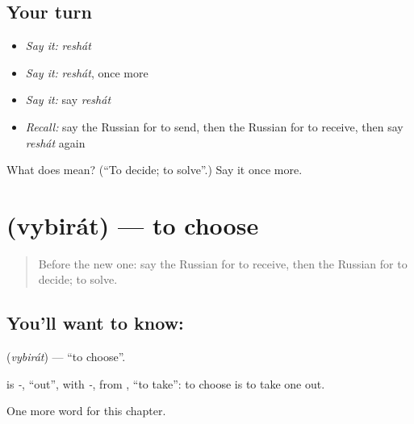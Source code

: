 \subsection*{Your turn}
\begin{itemize}
\raggedright
  \item \emph{Say it:} \emph{reshát}
  \item \emph{Say it:} \emph{reshát}, once more
  \item \emph{Say it:} say \emph{reshát}
  \item \emph{Recall:} say the Russian for to send, then the Russian for to receive, then say \emph{reshát} again
\end{itemize}

\begin{tcolorbox}[breakable,colback=teal!4,colframe=teal!35!black,title={Before you move on}]
What does  mean? (\textquotedblleft{}To decide; to solve\textquotedblright{}.) Say it once more.
\end{tcolorbox}
\section[\texorpdfstring{\ru{выбирать} (vybirát)}{выбирать (vybirát)}]{ (vybirát) — to choose}

\label{lesson:RU-C233-vybirat}



\begin{quote}
Before the new one: say the Russian for to receive, then the Russian for to decide; to solve.
\end{quote}

\subsection*{You'll want to know: }
\textbf{} (\emph{vybirát}) — \textquotedblleft{}to choose\textquotedblright{}.

\begin{cousinweb}
\textbf{} is \emph{-}, \textquotedblleft{}out\textquotedblright{}, with \emph{-}, from \emph{}, \textquotedblleft{}to take\textquotedblright{}: to choose is to take one out.
\end{cousinweb}

\begin{grammarlens}[title={What you've built}]
One more word for this chapter.
\end{grammarlens}

